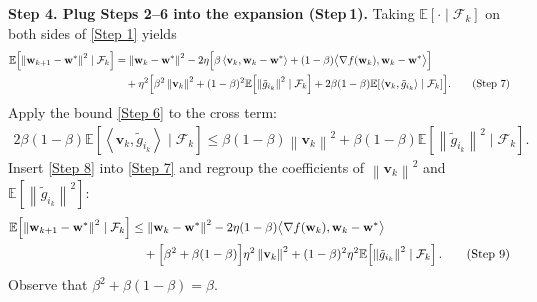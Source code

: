 \documentclass{article}
\newcommand{\E}{\mathbb{E}}
\newcommand{\norm}[1]{\left\|#1\right\|}
\newcommand{\ip}[2]{\left\langle #1,#2\right\rangle}
\begin{document}
\noindent\textbf{Step 4.  Plug Steps 2–6 into the expansion (Step 1).}
Taking $\E[\cdot\mid\mathcal F_k]$ on both sides of \eqref{Step 1} yields
\begin{align}
\E\!\left[\norm{\mathbf w_{k+1}-\mathbf w^{*}}^{2}\mid\mathcal F_k\right]
&= \norm{\mathbf w_{k}-\mathbf w^{*}}^{2}
-2\eta\Bigl[\beta\ip{\mathbf v_{k}}{\mathbf w_{k}-\mathbf w^{*}}
   +(1-\beta)\bigl\langle\nabla f(\mathbf w_k),\mathbf w_{k}-\mathbf w^{*}\bigr\rangle\Bigr]\nonumber\\
&\quad+\eta^{2}\Bigl[\beta^{2}\norm{\mathbf v_{k}}^{2}
   +(1-\beta)^{2}\E\!\left[\norm{\tilde g_{i_k}}^{2}\mid\mathcal F_k\right]
   +2\beta(1-\beta)\E\!\left[\ip{\mathbf v_{k}}{\tilde g_{i_k}}\mid\mathcal F_k\right]\Bigr].
\tag{Step 7}
\end{align}
Apply the bound \eqref{Step 6} to the cross term:
\begin{align}
2\beta(1-\beta)\E\!\left[\ip{\mathbf v_{k}}{\tilde g_{i_k}}\mid\mathcal F_k\right]
\le \beta(1-\beta)\norm{\mathbf v_{k}}^{2}
   +\beta(1-\beta)\E\!\left[\norm{\tilde g_{i_k}}^{2}\mid\mathcal F_k\right].
\tag{Step 8}
\end{align}
Insert \eqref{Step 8} into \eqref{Step 7} and regroup the coefficients of
$\norm{\mathbf v_{k}}^{2}$ and $\E[\norm{\tilde g_{i_k}}^{2}]$:
\begin{align}
\E\!\left[\norm{\mathbf w_{k+1}-\mathbf w^{*}}^{2}\mid\mathcal F_k\right]
&\le \norm{\mathbf w_{k}-\mathbf w^{*}}^{2}
-2\eta(1-\beta)\bigl\langle\nabla f(\mathbf w_k),\mathbf w_{k}-\mathbf w^{*}\bigr\rangle
\label{eq:preStrong}\\
&\quad
+\Bigl[\beta^{2}+\beta(1-\beta)\Bigr]\eta^{2}\norm{\mathbf v_{k}}^{2}
+(1-\beta)^{2}\eta^{2}\E\!\left[\norm{\tilde g_{i_k}}^{2}\mid\mathcal F_k\right].
\tag{Step 9}
\end{align}
Observe that $\beta^{2}+\beta(1-\beta)=\beta$.
\end{document}
